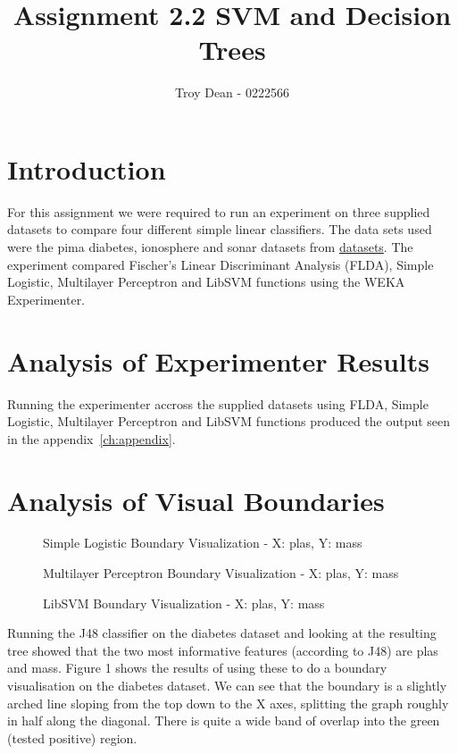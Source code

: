 \documentclass[10pt]{scrreprt}
\title{Assignment 2.2 SVM and Decision Trees}
\author{Troy Dean - 0222566}
\begin{document}
\maketitle


\section{Introduction}
For this assignment we were required to run an experiment on three supplied datasets to compare four different simple linear classifiers. The data sets used were the pima diabetes, ionosphere and sonar datasets from \href{https://sourceforge.net/projects/weka/files/datasets/datasets-UCI/datasets-UCI.jar}{datasets}. The experiment compared Fischer's Linear Discriminant Analysis (FLDA), Simple Logistic, Multilayer Perceptron and LibSVM functions using the WEKA Experimenter.

\section{Analysis of Experimenter Results}
Running the experimenter accross the supplied datasets using FLDA, Simple Logistic, Multilayer Perceptron and LibSVM functions produced the output seen in the appendix~\ref{ch:appendix}.

\section{Analysis of Visual Boundaries}
\begin{figure}[h]
\begin{center}
\end{center}
\caption{Simple Logistic Boundary Visualization - X: plas, Y: mass}
\end{figure}
\begin{figure}[h]
\begin{center}
\centering
\end{center}
\caption{Multilayer Perceptron Boundary Visualization - X: plas, Y: mass}
\end{figure}
\begin{figure}[h]
\begin{center}
\centering
\end{center}
\caption{LibSVM Boundary Visualization - X: plas, Y: mass}
\end{figure}
Running the J48 classifier on the diabetes dataset and looking at the resulting tree showed that the two most informative features (according to J48) are plas and mass. Figure 1 shows the results of using these to do a boundary visualisation on the diabetes dataset. We can see that the boundary is a slightly arched line sloping from the top down to the X axes, splitting the graph roughly in half along the diagonal. There is quite a wide band of overlap into the green (tested positive) region.
\end{document}
